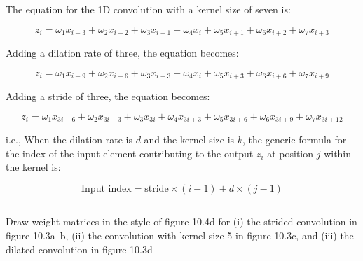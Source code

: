 \documentclass[12pt]{report}
\begin{document}
The equation for the 1D convolution with a kernel size of seven is:

\begin{equation*}
    z_{i} = \omega_{1}x_{i-3} + \omega_{2}x_{i-2} + \omega_{3}x_{i-1} + \omega_{4}x_{i} + \omega_{5}x_{i+1} + \omega_{6}x_{i+2} + \omega_{7}x_{i+3}
\end{equation*}

Adding a dilation rate of three, the equation becomes:

\begin{equation*}
    z_{i} = \omega_{1}x_{i-9} + \omega_{2}x_{i-6} + \omega_{3}x_{i-3} + \omega_{4}x_{i} + \omega_{5}x_{i+3} + \omega_{6}x_{i+6} + \omega_{7}x_{i+9}
\end{equation*}

Adding a stride of three, the equation becomes:

\begin{equation*}
    z_{i} = \omega_{1}x_{3i-6} + \omega_{2}x_{3i-3} + \omega_{3}x_{3i} + \omega_{4}x_{3i+3} + \omega_{5}x_{3i+6} + \omega_{6}x_{3i+9} + \omega_{7}x_{3i+12}
\end{equation*}

i.e., When the dilation rate is $d$ and the kernel size is $k$, the generic formula for the index of the input element contributing to the output $z_{i}$ at position $j$ within the kernel is:

\begin{equation*}
    \text{Input index} = \text{stride} \times (i-1) + d \times (j-1)
\end{equation*}

\newpage

\subsection{}
\begin{mdframed}
    Draw weight matrices in the style of figure 10.4d for (i) the strided convolution in figure 10.3a–b, (ii) the convolution with kernel size 5 in figure 10.3c, and (iii) the dilated convolution in figure 10.3d
\end{mdframed}
\end{document}
